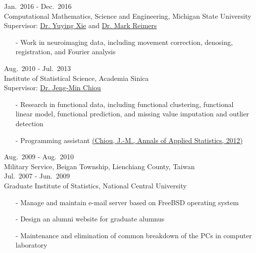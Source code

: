 \documentclass[a4paper,10pt,dvipdfmx]{article}
\begin{document}
\hfill Jan.~2016 - Dec.~2016\\
\indent Computational Mathematics, Science and Engineering, Michigan State University\\
\indent Supervisor: \href{https://cmse.msu.edu/directory/faculty/yuying-xie/}{Dr. Yuying Xie} and \href{https://msu.edu/~reimersm/}{Dr. Mark Reimers}
\begin{itemize}[noitemsep,nolistsep]
  \item[-] Work in neuroimaging data, including movement correction, denosing, registration, and Fourier analysis\\
\end{itemize}

\hfill Aug.~2010 - Jul.~2013\\
\indent Institute of Statistical Science, Academia Sinica\\
\indent Supervisor: \href{http://www.stat.sinica.edu.tw/jmchiou/}{Dr. Jeng-Min Chiou}
\begin{itemize}[noitemsep,nolistsep]
  \item[-] Research in functional data, including functional clustering, functional linear model, functional prediction, and missing value imputation and outlier detection
  \item[-] Programming assistant \href{https://projecteuclid.org/euclid.aoas/1356629052/}{(Chiou, J.-M., Annals of Applied Statistics, 2012)}\\
\end{itemize}

 \hfill Aug.~2009 - Aug.~2010\\
\indent Military Service, Beigan Township, Lienchiang County, Taiwan\\

 \hfill Jul.~2007 - Jun.~2009\\
\indent Graduate Institute of Statistics, National Central University
\begin{itemize}[noitemsep,nolistsep]
  \item[-] Manage and maintain e-mail server based on FreeBSD operating system
  \item[-] Design an alumni website for graduate alumnus
  \item[-] Maintenance and elimination of common breakdown of the PCs in computer laboratory\\
\end{itemize}
\end{document}
